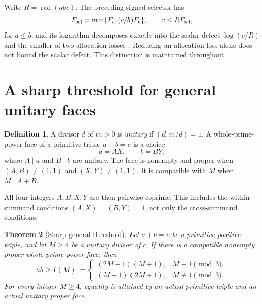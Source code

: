 \documentclass[11pt]{article}
\newtheorem{theorem}{Theorem}[section]
\theoremstyle{definition}\newtheorem{definition}[theorem]{Definition}
\theoremstyle{remark}\newtheorem{remark}[theorem]{Remark}
\newcommand{\rad}{\operatorname{rad}}
\begin{document}
Write \(R=\rad(abc)\). The preceding signed selector has
\[
 F_{\rm sel}=\min\{F_c,(c/b)F_b\},\qquad c\le RF_{\rm sel},
\]
for \(a\le b\), and its logarithm decomposes exactly into the scalar defect \(\log(c/R)\) and the smaller of two allocation losses \cite{second}. Reducing an allocation loss alone does not bound the scalar defect. This distinction is maintained throughout.

\section{A sharp threshold for general unitary faces}\label{sec:threshold}
\begin{definition}
A divisor \(d\) of \(m>0\) is \emph{unitary} if \((d,m/d)=1\). A whole-prime-power face of a primitive triple \(a+b=c\) is a choice
\[
 a=AX,\qquad b=BY,
\]
where \(A\mid a\) and \(B\mid b\) are unitary. The face is nonempty and proper when \((A,B)\ne(1,1)\) and \((X,Y)\ne(1,1)\). It is compatible with \(M\) when \(M\mid A+B\).
\end{definition}
All four integers \(A,B,X,Y\) are then pairwise coprime. This includes the within-summand conditions \((A,X)=(B,Y)=1\), not only the cross-summand conditions.

\begin{theorem}[Sharp general threshold]\label{thm:threshold}
Let \(a+b=c\) be a primitive positive triple, and let \(M\ge4\) be a unitary divisor of \(c\). If there is a compatible nonempty proper whole-prime-power face, then
\begin{equation}\label{eq:threshold}
 ab\ge T(M):=
 \begin{cases}
 (2M-1)(M+1),&M\equiv1\pmod3,\\
 (M-1)(2M+1),&M\not\equiv1\pmod3.
 \end{cases}
\end{equation}
For every integer \(M\ge4\), equality is attained by an actual primitive triple and an actual unitary proper face.
\end{theorem}
\end{document}
